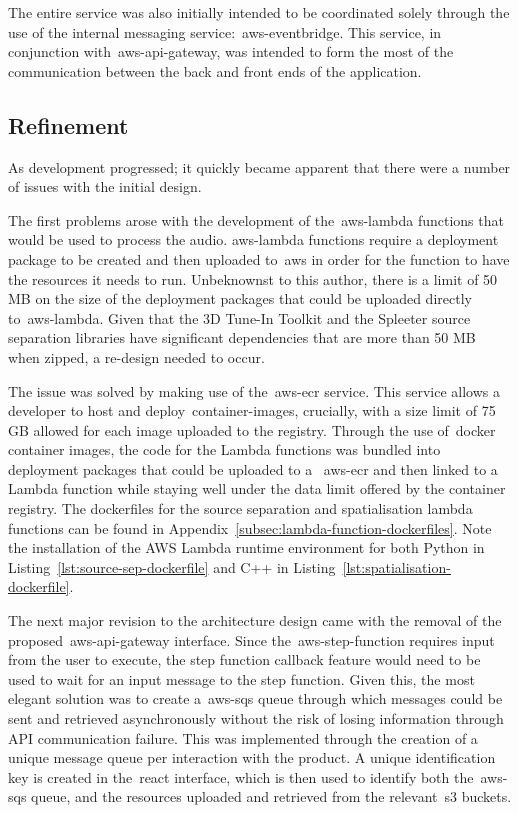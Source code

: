 The entire service was also initially intended
to be coordinated solely through the use of the internal messaging service:~\gls{aws-eventbridge}.
This service, in conjunction with~\gls{aws-api-gateway},
was intended to form the most of the communication between the back and front ends of the application.

\subsection{Refinement}\label{subsec:refinement}

As development progressed; it quickly became apparent that there were a number of issues with the initial design.

The first problems arose with the development of the~\gls{aws-lambda} functions that would be used to process the audio.
\gls{aws-lambda} functions
require a deployment package to be created
and then uploaded to~\gls{aws} in order for the function to have the resources it needs to run.
Unbeknownst to this author,
there is a limit of 50 MB on the size of the deployment packages that could be uploaded directly to~\gls{aws-lambda}.
Given that the 3D Tune-In Toolkit and the Spleeter source separation libraries have significant dependencies
that are more than 50 MB when zipped, a re-design needed to occur.

The issue was solved by making use of the~\gls{aws-ecr} service.
This service allows a developer to host and deploy~\glspl{container-image},
crucially, with a size limit of 75 GB allowed for each image uploaded to the registry.
Through the use of~\gls{docker} container images,
the code for the Lambda functions was bundled into deployment packages
that could be uploaded to a
~\gls{aws-ecr} and then linked to a Lambda function
while staying well under the data limit offered by the container registry.
The dockerfiles for the source separation and spatialisation lambda functions can be found in Appendix~\ref{subsec:lambda-function-dockerfiles}.
Note the installation of the AWS Lambda runtime environment for both Python in Listing~\ref{lst:source-sep-dockerfile} and C++ in Listing~\ref{lst:spatialisation-dockerfile}.

The next major revision to the architecture design came with the removal of the proposed~\gls{aws-api-gateway} interface.
Since the~\gls{aws-step-function} requires input from the user to execute,
the step function callback feature would need to be used to wait for an input message to the step function.
Given this,
the most elegant solution was
to create a~\gls{aws-sqs} queue through which messages could be sent
and retrieved asynchronously without the risk of losing information through API communication failure.
This was implemented through the creation of a unique message queue per interaction with the product.
A unique identification key is created in the~\gls{react} interface, which is then used
to identify both the~\gls{aws-sqs} queue, and the resources uploaded and retrieved from the relevant~\gls{s3} buckets.

